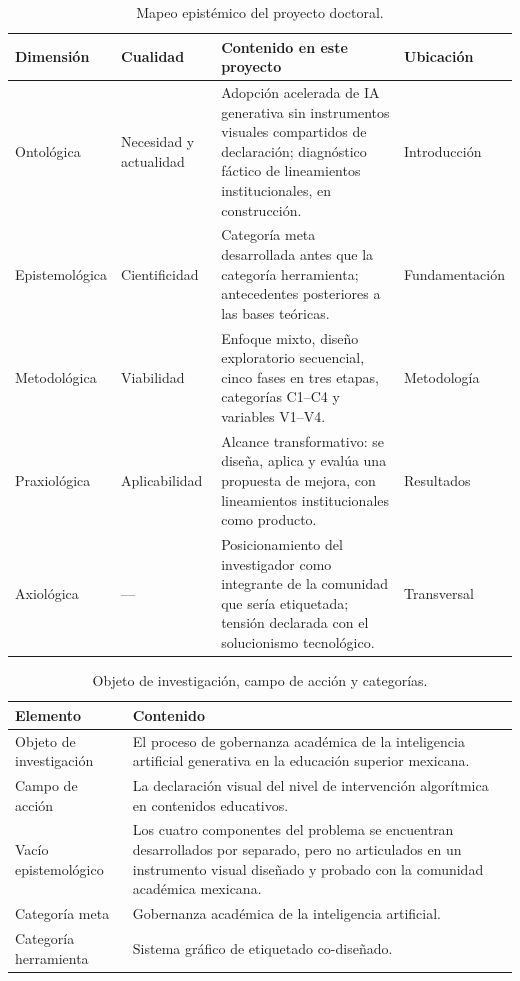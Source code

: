 \documentclass[letter,12pt]{article}
\begin{document}
\begin{table}[H]
\centering
\footnotesize
\caption{Mapeo epistémico del proyecto doctoral.}
\label{tab:mapeo}
\renewcommand{\arraystretch}{1.35}
\begin{tabular}{|p{2.0cm}|p{1.9cm}|p{6.4cm}|p{2.6cm}|}
\hline
\rowcolor{bgCotejo}
\textbf{Dimensión} & \textbf{Cualidad} & \textbf{Contenido en este proyecto} & \textbf{Ubicación} \\
\hline
Ontológica & Necesidad y actualidad & Adopción acelerada de IA generativa sin instrumentos visuales compartidos de declaración; diagnóstico fáctico de lineamientos institucionales, en construcción. & Introducción \\
\hline
Epistemológica & Cientificidad & Categoría meta desarrollada antes que la categoría herramienta; antecedentes posteriores a las bases teóricas. & Fundamentación \\
\hline
Metodológica & Viabilidad & Enfoque mixto, diseño exploratorio secuencial, cinco fases en tres etapas, categorías C1--C4 y variables V1--V4. & Metodología \\
\hline
Praxiológica & Aplicabilidad & Alcance transformativo: se diseña, aplica y evalúa una propuesta de mejora, con lineamientos institucionales como producto. & Resultados \\
\hline
Axiológica & --- & Posicionamiento del investigador como integrante de la comunidad que sería etiquetada; tensión declarada con el solucionismo tecnológico. & Transversal \\
\hline
\end{tabular}
\end{table}

\begin{table}[H]
\centering
\footnotesize
\caption{Objeto de investigación, campo de acción y categorías.}
\label{tab:objeto}
\renewcommand{\arraystretch}{1.35}
\begin{tabular}{|p{3.4cm}|p{9.2cm}|}
\hline
\rowcolor{bgCotejo}
\textbf{Elemento} & \textbf{Contenido} \\
\hline
Objeto de investigación & El proceso de gobernanza académica de la inteligencia artificial generativa en la educación superior mexicana. \\
\hline
Campo de acción & La declaración visual del nivel de intervención algorítmica en contenidos educativos. \\
\hline
Vacío epistemológico & Los cuatro componentes del problema se encuentran desarrollados por separado, pero no articulados en un instrumento visual diseñado y probado con la comunidad académica mexicana. \\
\hline
Categoría meta & Gobernanza académica de la inteligencia artificial. \\
\hline
Categoría herramienta & Sistema gráfico de etiquetado co-diseñado. \\
\hline
\end{tabular}
\end{table}
\end{document}
